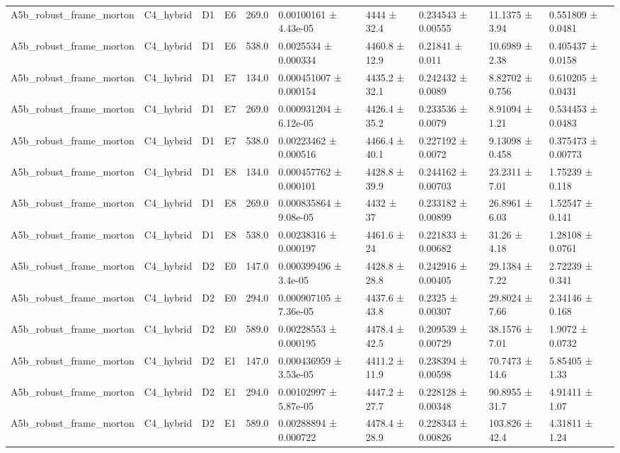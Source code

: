 \begin{table}
\begin{tabular}{llllllllll}
A5b\_robust\_frame\_morton & C4\_hybrid & D1 & E6 & 269.0 & 0.00100161 ± 4.43e-05 & 4444 ± 32.4 & 0.234543 ± 0.00555 & 11.1375 ± 3.94 & 0.551809 ± 0.0481 \\
A5b\_robust\_frame\_morton & C4\_hybrid & D1 & E6 & 538.0 & 0.0025534 ± 0.000334 & 4460.8 ± 12.9 & 0.21841 ± 0.011 & 10.6989 ± 2.38 & 0.405437 ± 0.0158 \\
A5b\_robust\_frame\_morton & C4\_hybrid & D1 & E7 & 134.0 & 0.000451007 ± 0.000154 & 4435.2 ± 32.1 & 0.242432 ± 0.0089 & 8.82702 ± 0.756 & 0.610205 ± 0.0431 \\
A5b\_robust\_frame\_morton & C4\_hybrid & D1 & E7 & 269.0 & 0.000931204 ± 6.12e-05 & 4426.4 ± 35.2 & 0.233536 ± 0.0079 & 8.91094 ± 1.21 & 0.534453 ± 0.0483 \\
A5b\_robust\_frame\_morton & C4\_hybrid & D1 & E7 & 538.0 & 0.00223462 ± 0.000516 & 4466.4 ± 40.1 & 0.227192 ± 0.0072 & 9.13098 ± 0.458 & 0.375473 ± 0.00773 \\
A5b\_robust\_frame\_morton & C4\_hybrid & D1 & E8 & 134.0 & 0.000457762 ± 0.000101 & 4428.8 ± 39.9 & 0.244162 ± 0.00703 & 23.2311 ± 7.01 & 1.75239 ± 0.118 \\
A5b\_robust\_frame\_morton & C4\_hybrid & D1 & E8 & 269.0 & 0.000835864 ± 9.08e-05 & 4432 ± 37 & 0.233182 ± 0.00899 & 26.8961 ± 6.03 & 1.52547 ± 0.141 \\
A5b\_robust\_frame\_morton & C4\_hybrid & D1 & E8 & 538.0 & 0.00238316 ± 0.000197 & 4461.6 ± 24 & 0.221833 ± 0.00682 & 31.26 ± 4.18 & 1.28108 ± 0.0761 \\
A5b\_robust\_frame\_morton & C4\_hybrid & D2 & E0 & 147.0 & 0.000399496 ± 3.4e-05 & 4428.8 ± 28.8 & 0.242916 ± 0.00405 & 29.1384 ± 7.22 & 2.72239 ± 0.341 \\
A5b\_robust\_frame\_morton & C4\_hybrid & D2 & E0 & 294.0 & 0.000907105 ± 7.36e-05 & 4437.6 ± 43.8 & 0.2325 ± 0.00307 & 29.8024 ± 7.66 & 2.34146 ± 0.168 \\
A5b\_robust\_frame\_morton & C4\_hybrid & D2 & E0 & 589.0 & 0.00228553 ± 0.000195 & 4478.4 ± 42.5 & 0.209539 ± 0.00729 & 38.1576 ± 7.01 & 1.9072 ± 0.0732 \\
A5b\_robust\_frame\_morton & C4\_hybrid & D2 & E1 & 147.0 & 0.000436959 ± 3.53e-05 & 4411.2 ± 11.9 & 0.238394 ± 0.00598 & 70.7473 ± 14.6 & 5.85405 ± 1.33 \\
A5b\_robust\_frame\_morton & C4\_hybrid & D2 & E1 & 294.0 & 0.00102997 ± 5.87e-05 & 4447.2 ± 27.7 & 0.228128 ± 0.00348 & 90.8955 ± 31.7 & 4.91411 ± 1.07 \\
A5b\_robust\_frame\_morton & C4\_hybrid & D2 & E1 & 589.0 & 0.00288894 ± 0.000722 & 4478.4 ± 28.9 & 0.228343 ± 0.00826 & 103.826 ± 42.4 & 4.31811 ± 1.24 \\

\end{tabular}
\end{table}
